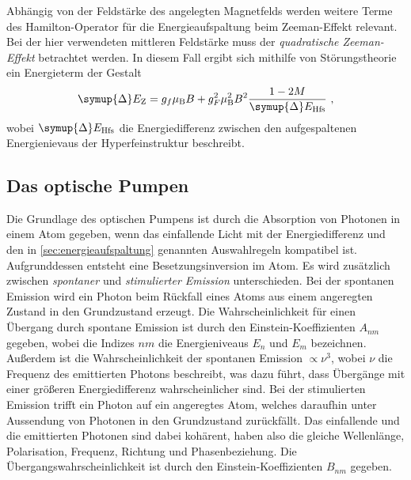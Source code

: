     Abhängig von der Feldstärke des angelegten Magnetfelds werden weitere Terme des Hamilton-Operator für die Energieaufspaltung beim Zeeman-Effekt relevant.
    Bei der hier verwendeten mittleren Feldstärke muss der \textit{quadratische Zeeman-Effekt} betrachtet werden.
    In diesem Fall ergibt sich mithilfe von Störungstheorie ein Energieterm der Gestalt
    \begin{equation}
        \symup{\Delta} E_\text{Z} = g_f \mu_\text{B} B + g^2_F \mu^2_\text{B} B^2 \frac{1 - 2M}{\symup{\Delta}E_\text{Hfs}} \ ,
        \label{eqn:quadr_zeeman}
    \end{equation}
    wobei $\symup{\Delta}E_\text{Hfs}$ die Energiedifferenz zwischen den aufgespaltenen Energienievaus der Hyperfeinstruktur beschreibt.


\subsection{Das optische Pumpen}
\label{sec:optisches_pumpen}

    Die Grundlage des optischen Pumpens ist durch die Absorption von Photonen in einem Atom gegeben,
    wenn das einfallende Licht mit der Energiedifferenz und den in \autoref{sec:energieaufspaltung} genannten Auswahlregeln kompatibel ist.
    Aufgrunddessen entsteht eine Besetzungsinversion im Atom.
    Es wird zusätzlich zwischen \textit{spontaner} und \textit{stimulierter Emission} unterschieden.
    Bei der spontanen Emission wird ein Photon beim Rückfall eines Atoms aus einem angeregten Zustand in den Grundzustand erzeugt.
    Die Wahrscheinlichkeit für einen Übergang durch spontane Emission ist durch den Einstein-Koeffizienten $A_{nm}$ gegeben,
    wobei die Indizes $nm$ die Energieniveaus $E_n$ und $E_m$ bezeichnen.
    Außerdem ist die Wahrscheinlichkeit der spontanen Emission $\propto \nu^3$,
    wobei $\nu$ die Frequenz des emittierten Photons beschreibt,
    was dazu führt,
    dass Übergänge mit einer größeren Energiedifferenz wahrscheinlicher sind.
    Bei der stimulierten Emission trifft ein Photon auf ein angeregtes Atom,
    welches daraufhin unter Aussendung von Photonen in den Grundzustand zurückfällt.
    Das einfallende und die emittierten Photonen sind dabei kohärent,
    haben also die gleiche Wellenlänge, Polarisation, Frequenz, Richtung und Phasenbeziehung.
    Die Übergangswahrscheinlichkeit ist durch den Einstein-Koeffizienten $B_{nm}$ gegeben.

